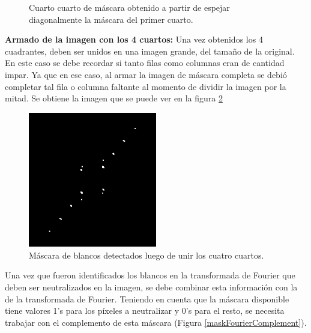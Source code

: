 \documentclass[10pt,a4paper, twoside]{report}
\newcounter{subsubsubsection}[subsubsection]
\begin{document}
\begin{figure}[!htb]
\begin {minipage}{0.48\textwidth}
			\caption{Cuarto cuarto de máscara obtenido a partir de espejar diagonalmente la máscara del primer cuarto.}
			\label{fourthQuarterMask}
   \end{minipage}
\end{figure}

\textbf{Armado de la imagen con los 4 cuartos:} Una vez obtenidos los 4 cuadrantes, deben ser unidos en una imagen grande, del tamaño de la original. En este caso se debe recordar si tanto filas como columnas eran de cantidad impar. Ya que en ese caso, al armar la imagen de máscara completa se debió completar tal fila o columna faltante al momento de dividir la imagen por la mitad. Se obtiene la imagen que se puede ver en la figura \ref{maskFourierComplete}

\begin{figure}[!htb]
   \centering      
   \includegraphics[width=0.5\textwidth]{imagenes/maskFourierComplete.jpg}
 \caption{Máscara de blancos detectados luego de unir los cuatro cuartos.}
 \label{maskFourierComplete}
\end{figure}




Una vez que fueron identificados los blancos en la transformada de Fourier que deben ser neutralizados en la imagen, se debe combinar esta información con la de la transformada de Fourier.
Teniendo en cuenta que la máscara disponible tiene valores 1's para los píxeles a neutralizar y 0's para el resto, se necesita trabajar con el complemento de esta máscara (Figura \ref{maskFourierComplement}). 
\end{document}

